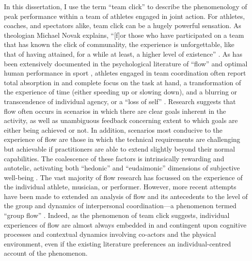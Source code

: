 \begin{CJK}{UTF8}{gbsn}
In this dissertation, I use the term ``team click'' to describe the phenomenology of peak performance within a team of athletes engaged in joint action.  For athletes, coaches, and spectators alike, team click can be a hugely powerful sensation. As theologian Michael Novak explains, ``[f]or those who have participated on a team that has known the click of communality, the experience is unforgettable, like that of having attained, for a while at least, a higher level of existence'' \citep[11]{White2011}. As has been extensively documented in the psychological literature of ``flow'' \citep{Csikszentmihalyi1992} and optimal human performance in sport \citep{Jackson1999}, athletes engaged in team coordination often report total absorption in and complete focus on the task at hand, a transformation of the experience of time (either speeding up or slowing down), and a blurring or transcendence of individual agency, or a ``loss of self''   \citep{Csikszentmihalyi1992,Jackson1995,Jackson1999,McNeill1995}.  Research suggests that flow often occurs in scenarios in which there are clear goals inherent in the activity, as well as unambiguous feedback concerning extent to which goals are either being achieved or not.
In addition, scenarios most conducive to the experience of flow are those in which the technical requirements are challenging but achievable if practitioners are able to extend slightly beyond their normal capabilities\citep{Fong2015}.
The coalescence of these factors is intrinsically rewarding and autotelic\citep{Csikszentmihalyi1975}, activating both ``hedonic'' and ``eudaimonic'' dimensions of subjective well-being \citep{Huta2010,Fave2009}.  The vast majority of flow research has focussed on the experience of the individual athlete, musician, or performer.  However, more recent attempts have been made to extended an analysis of flow and its antecedents to the level of the group and dynamics of interpersonal coordination---a phenomenon termed ``group flow'' \citep{Sawyer2006}. Indeed, as the phenomenon of team click suggests, individual experiences of flow are almost always embedded in and contingent upon cognitive processes and contextual dynamics involving co-actors and the physical environment, even if the existing literature preferences an individual-centred account of the phenomenon\citep{Kirsh2006,Marsh2009,Noy2015}.


\end{CJK}
